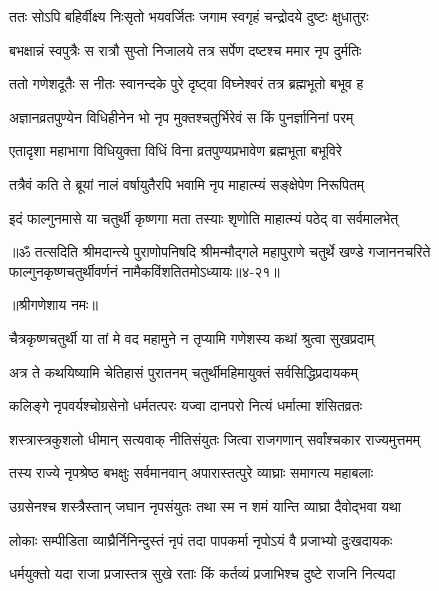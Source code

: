 \twolineshloka
{ततः सोऽपि बहिर्वीक्ष्य निःसृतो भयवर्जितः}
{जगाम स्वगृहं चन्द्रोदये दुष्टः क्षुधातुरः} %

\twolineshloka
{बभक्षान्नं स्वपुत्रैः स रात्रौ सुप्तो निजालये}
{तत्र सर्पेण दष्टश्च ममार नृप दुर्मतिः} %

\twolineshloka
{ततो गणेशदूतैः स नीतः स्वानन्दके पुरे}
{दृष्ट्वा विघ्नेश्वरं तत्र ब्रह्मभूतो बभूव ह} %

\twolineshloka
{अज्ञानव्रतपुण्येन विधिहीनेन भो नृप}
{मुक्तश्चतुर्भिरेवं स किं पुनर्ज्ञानिनां परम्} %

\twolineshloka
{एतादृशा महाभागा विधियुक्ता विधिं विना}
{व्रतपुण्यप्रभावेण ब्रह्मभूता बभूविरे} %

\twolineshloka
{तत्रैवं कति ते ब्रूयां नालं वर्षायुतैरपि}
{भवामि नृप माहात्म्यं सङ्क्षेपेण निरूपितम्} %

\twolineshloka
{इदं फाल्गुनमासे या चतुर्थी कृष्णगा मता}
{तस्याः श‍ृणोति माहात्म्यं पठेद् वा सर्वमालभेत्} %

॥ॐ तत्सदिति श्रीमदान्त्ये पुराणोपनिषदि श्रीमन्मौद्गले महापुराणे चतुर्थे खण्डे गजाननचरिते फाल्गुनकृष्णचतुर्थीवर्णनं नामैकविंशतितमोऽध्यायः॥४-२१॥


\label{sec:chaitra-krishna-chaturthi-mahatmya-varnanam}

\centerline{॥श्रीगणेशाय नमः॥}


\twolineshloka
{चैत्रकृष्णचतुर्थी या तां मे वद महामुने}
{न तृप्यामि गणेशस्य कथां श्रुत्वा सुखप्रदाम्} %


\twolineshloka
{अत्र ते कथयिष्यामि चेतिहासं पुरातनम्}
{चतुर्थीमहिमायुक्तं सर्वसिद्धिप्रदायकम्} %

\twolineshloka
{कलिङ्गे नृपवर्यश्चोग्रसेनो धर्मतत्परः}
{यज्वा दानपरो नित्यं धर्मात्मा शंसितव्रतः} %

\twolineshloka
{शस्त्रास्त्रकुशलो धीमान् सत्यवाक् नीतिसंयुतः}
{जित्वा राजगणान् सर्वांश्चकार राज्यमुत्तमम्} %

\twolineshloka
{तस्य राज्ये नृपश्रेष्ठ बभक्षुः सर्वमानवान्}
{अपारास्तत्पुरे व्याघ्राः समागत्य महाबलाः} %

\twolineshloka
{उग्रसेनश्च शस्त्रैस्तान् जघान नृपसंयुतः}
{तथा स्म न शमं यान्ति व्याघ्रा दैवोद्भवा यथा} %

\twolineshloka
{लोकाः सम्पीडिता व्याघ्रैर्निनिन्दुस्तं नृपं तदा}
{पापकर्मा नृपोऽयं वै प्रजाभ्यो दुःखदायकः} %

\twolineshloka
{धर्मयुक्तो यदा राजा प्रजास्तत्र सुखे रताः}
{किं कर्तव्यं प्रजाभिश्च दुष्टे राजनि नित्यदा} %

